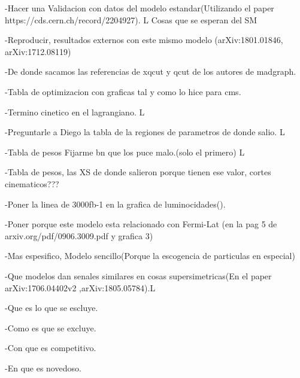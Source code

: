 -Hacer una Validacion con datos del modelo estandar(Utilizando el paper https://cds.cern.ch/record/2204927). L
Cosas que se esperan del SM

-Reproducir, resultados externos con este mismo modelo (arXiv:1801.01846, arXiv:1712.08119)

-De donde sacamos las referencias de xqcut y qcut de los autores de madgraph.

-Tabla de optimizacion con graficas tal y como lo hice para cms.

-Termino cinetico en el lagrangiano. L

-Preguntarle a Diego la tabla de la regiones de parametros de donde salio. L

-Tabla de pesos Fijarme bn que los puce malo.(solo el primero) L

-Tabla de pesos, las XS de donde salieron porque tienen ese valor, cortes cinematicos???

-Poner la linea de 3000fb-1 en la grafica de luminocidades().

-Poner porque este modelo esta relacionado con Fermi-Lat (en la pag 5 de arxiv.org/pdf/0906.3009.pdf y grafica 3)

-Mas espesifico, Modelo sencillo(Porque la escogencia de particulas en especial) 

-Que modelos dan senales similares en cosas supersimetricas(En el paper arXiv:1706.04402v2 ,arXiv:1805.05784).L

-Que es lo que se escluye.

-Como es que se excluye.

-Con que es competitivo.

-En que es novedoso.